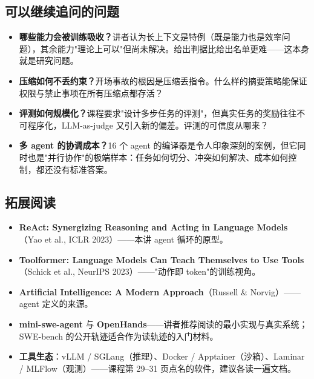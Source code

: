 \documentclass[a4paper]{article}
\begin{document}
\subsection{可以继续追问的问题}

\begin{itemize}
\item \textbf{哪些能力会被训练吸收？}讲者认为长上下文是特例（既是能力也是效率问题），其余能力"理论上可以"但尚未解决。给出判据比给出名单更难——这本身就是研究问题。
\item \textbf{压缩如何不丢约束？}开场事故的根因是压缩丢指令。什么样的摘要策略能保证权限与禁止事项在所有压缩点都存活？
\item \textbf{评测如何规模化？}课程要求"设计多步任务的评测"，但真实任务的奖励往往不可程序化，LLM-as-judge 又引入新的偏差。评测的可信度从哪来？
\item \textbf{多 agent 的协调成本？}16 个 agent 的编译器是令人印象深刻的案例，但它同时也是"并行协作"的极端样本：任务如何切分、冲突如何解决、成本如何控制，都还没有标准答案。
\end{itemize}

\subsection{拓展阅读}
\begin{itemize}
\item \textbf{ReAct: Synergizing Reasoning and Acting in Language Models}（Yao et al., ICLR 2023）——本讲 agent 循环的原型。
\item \textbf{Toolformer: Language Models Can Teach Themselves to Use Tools}（Schick et al., NeurIPS 2023）——"动作即 token"的训练视角。
\item \textbf{Artificial Intelligence: A Modern Approach}（Russell \& Norvig）——agent 定义的来源。
\item \textbf{mini-swe-agent} 与 \textbf{OpenHands}——讲者推荐阅读的最小实现与真实系统；SWE-bench 的公开轨迹适合作为读轨迹的入门材料。
\item \textbf{工具生态}：vLLM / SGLang（推理）、Docker / Apptainer（沙箱）、Laminar / MLFlow（观测）——课程第 29--31 页点名的软件，建议各读一遍文档。
\end{itemize}

\end{document}
